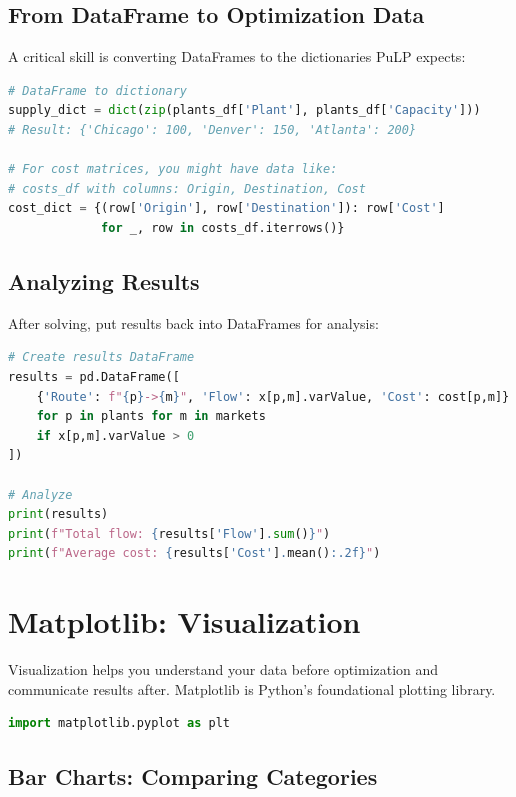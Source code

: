 \subsection{From DataFrame to Optimization Data}

A critical skill is converting DataFrames to the dictionaries PuLP expects:

\begin{lstlisting}[language=Python]
# DataFrame to dictionary
supply_dict = dict(zip(plants_df['Plant'], plants_df['Capacity']))
# Result: {'Chicago': 100, 'Denver': 150, 'Atlanta': 200}

# For cost matrices, you might have data like:
# costs_df with columns: Origin, Destination, Cost
cost_dict = {(row['Origin'], row['Destination']): row['Cost']
             for _, row in costs_df.iterrows()}
\end{lstlisting}

\subsection{Analyzing Results}

After solving, put results back into DataFrames for analysis:

\begin{lstlisting}[language=Python]
# Create results DataFrame
results = pd.DataFrame([
    {'Route': f"{p}->{m}", 'Flow': x[p,m].varValue, 'Cost': cost[p,m]}
    for p in plants for m in markets
    if x[p,m].varValue > 0
])

# Analyze
print(results)
print(f"Total flow: {results['Flow'].sum()}")
print(f"Average cost: {results['Cost'].mean():.2f}")
\end{lstlisting}

\section{Matplotlib: Visualization}

Visualization helps you understand your data before optimization and communicate results after. Matplotlib is Python's foundational plotting library.

\begin{lstlisting}[language=Python]
import matplotlib.pyplot as plt
\end{lstlisting}

\subsection{Bar Charts: Comparing Categories}


